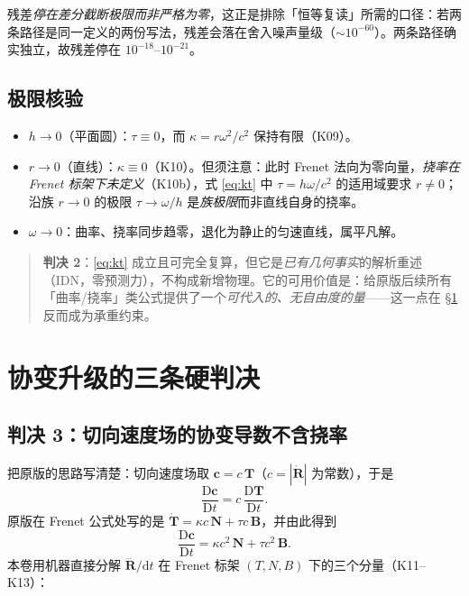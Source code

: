 \documentclass[UTF8,fontset=fandol,11pt]{ctexart}
\newcommand{\dd}{\mathrm{d}}
\newcommand{\DD}{\mathrm{D}}
\newcommand{\bx}{\boldsymbol}
\begin{document}
残差\emph{停在差分截断极限而非严格为零}，这正是排除「恒等复读」所需的口径：若两条路径是同一定义的两份写法，残差会落在舍入噪声量级（$\sim10^{-60}$）。两条路径确实独立，故残差停在 $10^{-18}$--$10^{-21}$。

\subsection{极限核验}
\begin{itemize}
  \item $h\to0$（平面圆）：$\tau\equiv0$，而 $\kappa=r\omega^2/c^2$ 保持有限（K09）。
  \item $r\to0$（直线）：$\kappa\equiv0$（K10）。但须注意：此时 Frenet 法向为零向量，\emph{挠率在 Frenet 标架下未定义}（K10b），式 \eqref{eq:kt} 中 $\tau=h\omega/c^2$ 的适用域要求 $r\neq0$；沿族 $r\to0$ 的极限 $\tau\to\omega/h$ 是\emph{族极限}而非直线自身的挠率。
  \item $\omega\to0$：曲率、挠率同步趋零，退化为静止的匀速直线，属平凡解。
\end{itemize}

\begin{quote}
\textbf{判决 2}：\eqref{eq:kt} 成立且可完全复算，但它是\emph{已有几何事实}的解析重述（IDN，零预测力），不构成新增物理。它的可用价值是：给原版后续所有「曲率/挠率」类公式提供了一个\emph{可代入的、无自由度的量}——这一点在 \S\ref{sec:covariant} 反而成为承重约束。
\end{quote}

\section{协变升级的三条硬判决}
\label{sec:covariant}

\subsection{判决 3：切向速度场的协变导数不含挠率}
把原版的思路写清楚：切向速度场取 $\bx c=c\,\bx T$（$c=|\dot{\bx R}|$ 为常数），于是
\begin{equation}
  \frac{\DD\bx c}{\DD t}=c\,\frac{\DD\bx T}{\DD t}.
\end{equation}
原版在 Frenet 公式处写的是 $\dot{\bx T}=\kappa c\,\bx N+\tau c\,\bx B$，并由此得到
\begin{equation}
  \frac{\DD\bx c}{\DD t}=\kappa c^2\,\bx N+\tau c^2\,\bx B .
  \label{eq:draftdc}
\end{equation}
本卷用机器直接分解 $\dddot{\bx R}/\dd t$ 在 Frenet 标架 $(T,N,B)$ 下的三个分量（K11--K13）：
\end{document}
